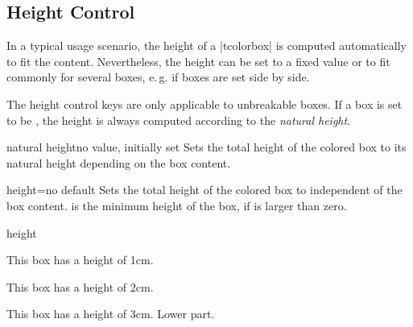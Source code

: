 \clearpage
\subsection{Height Control}\label{sec:heightcontrol}
In a typical usage scenario, the height of a |tcolorbox| is computed automatically
to fit the content. Nevertheless, the height can be set to a fixed value
or to fit commonly for several boxes, e.\,g. if boxes are set side by side.

\bigskip
\begin{marker}
  The height control keys are only applicable to unbreakable boxes.
  If a box is set to be , the height is always
  computed according to the \emph{natural height}.
\end{marker}
\bigskip


\begin{docTcbKey}{natural height}{}{no value, initially set}
  Sets the total height of the colored box to its natural height depending
  on the box content.
\end{docTcbKey}

\begin{docTcbKey}{height}{=}{no default}
  Sets the total height of the colored box to  independent
  of the box content.  is the minimum height of the box, if
   is larger than zero.
\begin{exdispExample}{height}

\begin{tcolorbox}[height=1cm,valign=center]
  This box has a height of 1cm.
\end{tcolorbox}
\begin{tcolorbox}[height=2cm,valign=center]
  This box has a height of 2cm.
\end{tcolorbox}
\begin{tcolorbox}[height=3cm,split=0.5,valign=center,valign lower=center]
  This box has a height of 3cm.
  \tcblower
  Lower part.
\end{tcolorbox}
\end{exdispExample}
\end{docTcbKey}

